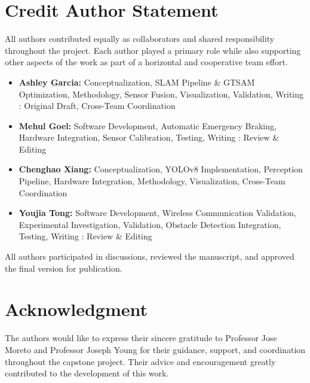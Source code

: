 \documentclass[journal,transmag]{IEEEtran}
\begin{document}
\section*{Credit Author Statement}
\small
All authors contributed equally as collaborators and shared responsibility throughout the project.  
Each author played a primary role while also supporting other aspects of the work as part of a horizontal and cooperative team effort.

\begin{itemize}
    \item \textbf{Ashley Garcia:} Conceptualization, SLAM Pipeline \& GTSAM Optimization, Methodology, Sensor Fusion, Visualization, Validation, Writing : Original Draft, Cross-Team Coordination
    \item \textbf{Mehul Goel:} Software Development, Automatic Emergency Braking, Hardware Integration, Sensor Calibration, Testing, Writing : Review \& Editing  
    \item \textbf{Chenghao Xiang:} Conceptualization, YOLOv8 Implementation, Perception Pipeline, Hardware Integration, Methodology, Visualization, Cross-Team Coordination
    \item \textbf{Youjia Tong:} Software Development, Wireless Communication Validation, Experimental Investigation, Validation, Obstacle Detection Integration, Testing, Writing : Review \& Editing 
\end{itemize}

All authors participated in discussions, reviewed the manuscript, and approved the final version for publication.

\normalsize

\section*{Acknowledgment}
\small
The authors would like to express their sincere gratitude to Professor Jose Moreto and Professor Joseph Young for their guidance, support, and coordination throughout the capstone project. Their advice and encouragement greatly contributed to the development of this work.









\end{document}
